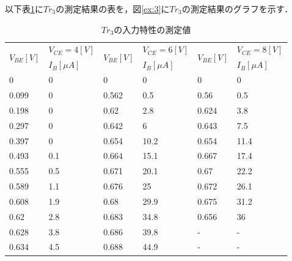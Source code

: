 \documentclass[10pt, a4j, dvipdfmx]{jarticle}
\begin{document}
    \newpage
    以下表\ref{tbl:3}に$Tr_3$の測定結果の表を，図\ref{ex:3}に$Tr_3$の測定結果のグラフを示す．
    \begin{table}[H]
        \centering
        \caption{$Tr_3$の入力特性の測定値}
        \label{tbl:3}
        \small
        \begin{tabular}{|l|l|l|l|l|l|}
        \hline
        \multirow{2}{*}{$V_{BE}[V]$} & $V_{CE}=4[V]$ & \multirow{2}{*}{$V_{BE}[V]$} & $V_{CE}=6[V]$ & \multirow{2}{*}{$V_{BE}[V]$} & $V_{CE}=8[V]$ \\ \cline{2-2} \cline{4-4} \cline{6-6} 
        & $I_B[\mu A]$   &                         & $I_B[\mu A]$   &                         & $I_B[\mu A]$   \\ \hline
        0                       & 0        & 0                       & 0        & 0                       & 0        \\ \hline
        0.099                   & 0        & 0.562                   & 0.5      & 0.56                    & 0.5      \\ \hline
        0.198                   & 0        & 0.62                    & 2.8      & 0.624                   & 3.8      \\ \hline
        0.297                   & 0        & 0.642                   & 6        & 0.643                   & 7.5      \\ \hline
        0.397                   & 0        & 0.654                   & 10.2     & 0.654                   & 11.4     \\ \hline
        0.493                   & 0.1      & 0.664                   & 15.1     & 0.667                   & 17.4     \\ \hline
        0.555                   & 0.5      & 0.671                   & 20.1     & 0.67                    & 22.2     \\ \hline
        0.589                   & 1.1      & 0.676                   & 25       & 0.672                   & 26.1     \\ \hline
        0.608                   & 1.9      & 0.68                    & 29.9     & 0.675                   & 31.2     \\ \hline
        0.62                    & 2.8      & 0.683                   & 34.8     & 0.656                   & 36       \\ \hline
        0.628                   & 3.8      & 0.686                   & 39.8     & -                       & -        \\ \hline
        0.634                   & 4.5      & 0.688                   & 44.9     & -                       & -        \\ \hline

\end{tabular}
\end{table}
\end{document}
